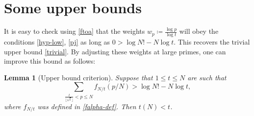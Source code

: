 \documentclass[10pt,a4paper,reqno]{amsart}
\numberwithin{equation}{section}
\theoremstyle{plain}
\newtheorem{lemma}[theorem]{Lemma}
\theoremstyle{definition}
\begin{document}
\FloatBarrier

\section{Some upper bounds}\label{upper-sec}

It is easy to check using \eqref{ftoa} that the weights $w_p \coloneqq \frac{\log p}{\log t}$ will obey the conditions \eqref{hyp-low}, \eqref{pj} as long as $0 > \log N! - N \log t$.  This recovers the trivial upper bound \eqref{trivial}.  By adjusting these weights at large primes, one can improve this bound as follows:

\begin{lemma}[Upper bound criterion]\label{upper-crit}  Suppose that $1 \leq t \leq N$ are such that
  \begin{equation}\label{contra}
     \sum_{\frac{t}{\lfloor\sqrt{t}\rfloor} < p \leq N} f_{N/t}(p/N) > \log N! - N \log t,
  \end{equation}
  where $f_{N/t}$ was defined in \eqref{falpha-def}.
  Then $t(N) < t$.
  \end{lemma}
\end{document}
